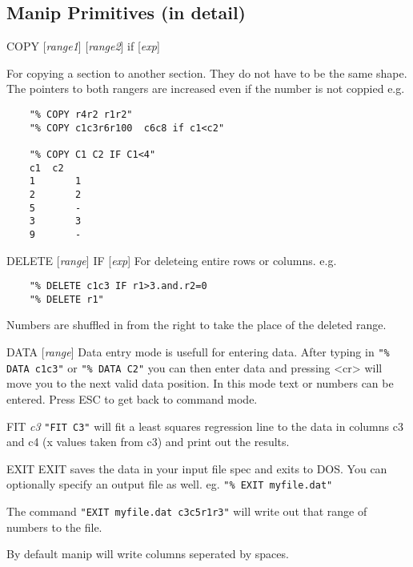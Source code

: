 \subsection{Manip Primitives (in detail)}
%
\begin{commanddescription}
\item[{\sf COPY [{\it range1}] [{\it range2}]  if [{\it exp}]}]

For copying a section to another section.
They do not have to be the same shape. The pointers to both rangers
are increased even if the number is not coppied  e.g.
\begin{verbatim} 
	"% COPY r4r2 r1r2"
	"% COPY c1c3r6r100  c6c8 if c1<c2"

	"% COPY C1 C2 IF C1<4"
	c1 	c2
	1       1
	2       2
	5       -
	3       3
	9       -
\end{verbatim}

\item[{\sf DELETE [{\it range}] IF [{\it exp}]}]
For deleteing entire rows or columns. e.g.
\begin{verbatim}
	"% DELETE c1c3 IF r1>3.and.r2=0
	"% DELETE r1"
\end{verbatim}
Numbers are shuffled in from the right to take the place of the
deleted range.

\item[{\sf DATA [{\it range}]}]
Data entry mode is usefull for entering data.  After typing in
\verb#"% DATA c1c3"# or \verb#"% DATA C2"# you can then enter data and pressing
{\sf <cr>} will move you to the next valid data position.
In this mode text or numbers can be entered.
Press {\sf ESC} to get back to command mode.

\item[{\sf FIT {\it c3}}]
\verb#"FIT C3"# will fit a least squares regression line to the data
in columns c3 and c4 (x values taken from c3) and print
out the results.

\item[{\sf EXIT}]
EXIT saves the data in your input file spec and exits to DOS.  You
can optionally specify an output file as well. eg. 
\verb#"% EXIT myfile.dat"#

The command \verb#"EXIT myfile.dat c3c5r1r3"# will write out that range of
numbers to the file.

By default manip will write columns seperated by spaces.


\end{commanddescription}
